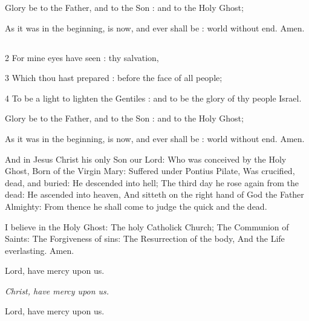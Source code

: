 Glory be to the Father, and to the Son : and to the Holy Ghost;

As it was in the beginning, is now, and ever shall be : world without end. Amen.


\subsection{}


2 For mine eyes have seen : thy salvation,

3 Which thou hast prepared : before the face of all people;

4 To be a light to lighten the Gentiles : and to be the glory of thy people Israel.

Glory be to the Father, and to the Son : and to the Holy Ghost;

As it was in the beginning, is now, and ever shall be : world without end. Amen.




And in Jesus Christ his only Son our Lord: Who was conceived by the Holy Ghost, Born of the Virgin Mary: Suffered under Pontius Pilate, Was crucified, dead, and buried: He descended into hell; The third day he rose again from the dead: He ascended into heaven, And sitteth on the right hand of God the Father Almighty: From thence he shall come to judge the quick and the dead.

I believe in the Holy Ghost: The holy Catholick Church; The Communion of Saints: The Forgiveness of sins: The Resurrection of the body, And the Life everlasting. Amen.


\centerline{Lord, have mercy upon us.}
\centerline{\emph{Christ, have mercy upon us.}}
\centerline{Lord, have mercy upon us.}


